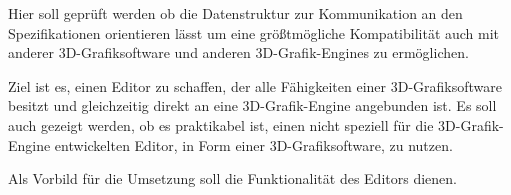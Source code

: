 Hier soll geprüft werden ob die Datenstruktur zur Kommunikation an den  Spezifikationen orientieren lässt um eine größtmögliche Kompatibilität auch mit anderer 3D-Grafiksoftware und anderen 3D-Grafik-Engines zu ermöglichen.

Ziel ist es, einen Editor zu schaffen, der alle Fähigkeiten einer 3D-Grafiksoftware besitzt und gleichzeitig direkt an eine 3D-Grafik-Engine angebunden ist. Es soll auch gezeigt werden, ob es praktikabel ist, einen nicht speziell für die 3D-Grafik-Engine entwickelten Editor, in Form einer 3D-Grafiksoftware, zu nutzen.

Als Vorbild für die Umsetzung soll die Funktionalität des  Editors dienen.
